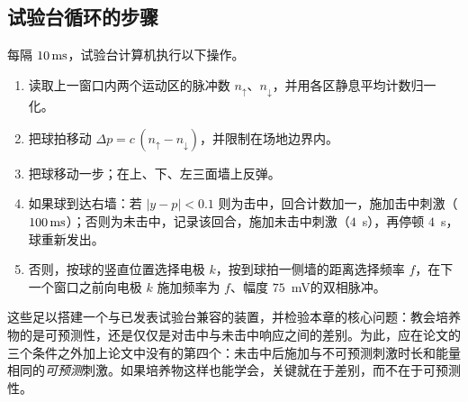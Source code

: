 \subsection*{试验台循环的步骤}

每隔 $10\,\text{ms}$，试验台计算机执行以下操作。
\begin{enumerate}
\item 读取上一窗口内两个运动区的脉冲数 $n_\uparrow$、$n_\downarrow$，并用各区静息平均计数归一化。
\item 把球拍移动 $\Delta p=c\,(n_\uparrow-n_\downarrow)$，并限制在场地边界内。
\item 把球移动一步；在上、下、左三面墙上反弹。
\item 如果球到达右墙：若 $|y-p|<0.1$ 则为击中，回合计数加一，施加击中刺激（$100\,\text{ms}$）；否则为未击中，记录该回合，施加未击中刺激（$4$~s），再停顿 $4$~s，球重新发出。
\item 否则，按球的竖直位置选择电极 $k$，按到球拍一侧墙的距离选择频率 $f$，在下一个窗口之前向电极 $k$ 施加频率为 $f$、幅度 $75$~mV的双相脉冲。
\end{enumerate}
这些足以搭建一个与已发表试验台兼容的装置，并检验本章的核心问题：教会培养物的是可预测性，还是仅仅是对击中与未击中响应之间的差别。为此，应在论文的三个条件之外加上论文中没有的第四个：未击中后施加与不可预测刺激时长和能量相同的\emph{可预测}刺激。如果培养物这样也能学会，关键就在于差别，而不在于可预测性。
